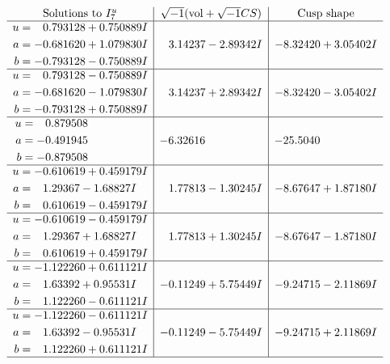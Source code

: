 \documentclass[1p]{elsarticle_modified}
\theoremstyle{definition}
\newcommand{\I}{\sqrt{-1}}
\begin{document}
$$\begin{array}{c|c|c}  
\text{Solutions to }I^u_{7}& \I (\text{vol} + \sqrt{-1}CS) & \text{Cusp shape}\\
 \hline 
\begin{aligned}
u &= \phantom{-}0.793128 + 0.750889 I \\
a &= -0.681620 + 1.079830 I \\
b &= -0.793128 - 0.750889 I\end{aligned}
 & \phantom{-}3.14237 - 2.89342 I & -8.32420 + 3.05402 I \\ \hline\begin{aligned}
u &= \phantom{-}0.793128 - 0.750889 I \\
a &= -0.681620 - 1.079830 I \\
b &= -0.793128 + 0.750889 I\end{aligned}
 & \phantom{-}3.14237 + 2.89342 I & -8.32420 - 3.05402 I \\ \hline\begin{aligned}
u &= \phantom{-}0.879508\phantom{ +0.000000I} \\
a &= -0.491945\phantom{ +0.000000I} \\
b &= -0.879508\phantom{ +0.000000I}\end{aligned}
 & -6.32616\phantom{ +0.000000I} & -25.5040\phantom{ +0.000000I} \\ \hline\begin{aligned}
u &= -0.610619 + 0.459179 I \\
a &= \phantom{-}1.29367 - 1.68827 I \\
b &= \phantom{-}0.610619 - 0.459179 I\end{aligned}
 & \phantom{-}1.77813 - 1.30245 I & -8.67647 + 1.87180 I \\ \hline\begin{aligned}
u &= -0.610619 - 0.459179 I \\
a &= \phantom{-}1.29367 + 1.68827 I \\
b &= \phantom{-}0.610619 + 0.459179 I\end{aligned}
 & \phantom{-}1.77813 + 1.30245 I & -8.67647 - 1.87180 I \\ \hline\begin{aligned}
u &= -1.122260 + 0.611121 I \\
a &= \phantom{-}1.63392 + 0.95531 I \\
b &= \phantom{-}1.122260 - 0.611121 I\end{aligned}
 & -0.11249 + 5.75449 I & -9.24715 - 2.11869 I \\ \hline\begin{aligned}
u &= -1.122260 - 0.611121 I \\
a &= \phantom{-}1.63392 - 0.95531 I \\
b &= \phantom{-}1.122260 + 0.611121 I\end{aligned}
 & -0.11249 - 5.75449 I & -9.24715 + 2.11869 I\\
 \hline 
 \end{array}$$\newpage\newpage\renewcommand{\arraystretch}{1}
\end{document}
